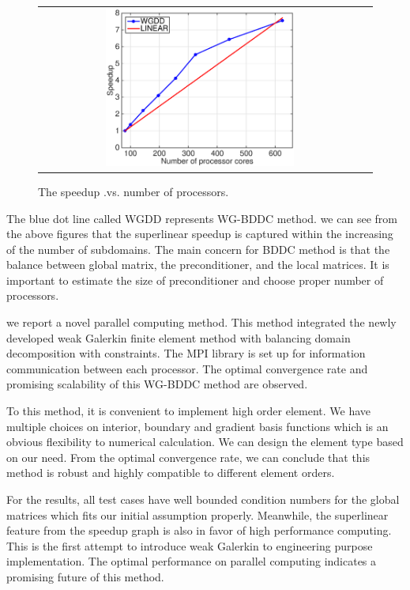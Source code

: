 				
					\begin{figure}[h]
						\centering
						\begin{tabular}{cc}
							 \includegraphics[width=0.6\textwidth]{./pics/p1speed.eps}
						\end{tabular}
						\caption{\footnotesize The speedup .vs. number of processors.}\label{fig6: time}
					\end{figure}
				
				The blue dot line called WGDD represents WG-BDDC method. we can see from the above figures that the superlinear speedup is captured within the increasing of the number of subdomains. The main concern for BDDC method is that the balance between global matrix, the preconditioner, and the local matrices. It is important to estimate the size of preconditioner and choose proper number of processors.
				
				
	we report a novel parallel computing method. This method integrated the newly developed weak Galerkin finite element method with balancing domain decomposition with constraints. The MPI library is set up for information communication between each processor. The optimal convergence rate and promising scalability of this WG-BDDC method are observed.
	
	To this method, it is convenient to implement high order element. We have multiple choices on interior, boundary and gradient basis functions which is an obvious flexibility to numerical calculation. We can design the element type based on our need. From the optimal convergence rate, we can conclude that this method is robust and highly compatible to different element orders.
	
	For the results, all test cases have well bounded condition numbers for the global matrices which fits our initial assumption properly. Meanwhile, the superlinear feature from the speedup graph is also in favor of high performance computing. This is the first attempt to introduce weak Galerkin to engineering purpose implementation. The optimal performance on parallel computing indicates a promising future of this method.